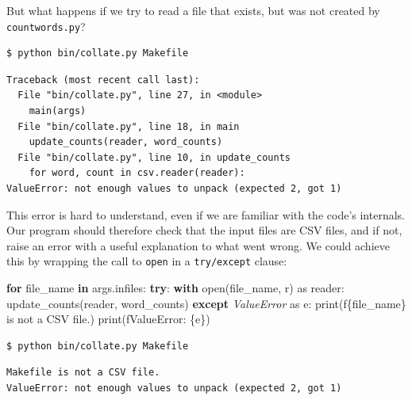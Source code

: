 \documentclass[
]{krantz}
\makeatletter
\newenvironment{Shaded}{\begin{snugshade}}{\end{snugshade}}
\newcommand{\BuiltInTok}[1]{#1}
\newcommand{\ControlFlowTok}[1]{\textcolor[rgb]{0.13,0.29,0.53}{\textbf{#1}}}
\newcommand{\ImportTok}[1]{#1}
\newcommand{\KeywordTok}[1]{\textcolor[rgb]{0.13,0.29,0.53}{\textbf{#1}}}
\newcommand{\NormalTok}[1]{#1}
\newcommand{\PreprocessorTok}[1]{\textcolor[rgb]{0.56,0.35,0.01}{\textit{#1}}}
\newcommand{\SpecialCharTok}[1]{\textcolor[rgb]{0.00,0.00,0.00}{#1}}
\newcommand{\SpecialStringTok}[1]{\textcolor[rgb]{0.31,0.60,0.02}{#1}}
\newcommand{\StringTok}[1]{\textcolor[rgb]{0.31,0.60,0.02}{#1}}
\newenvironment{kframe}{%
\medskip{}
\setlength{\fboxsep}{.8em}
 \def\at@end@of@kframe{}%
 \ifinner\ifhmode%
  \def\at@end@of@kframe{\end{minipage}}%
  \begin{minipage}{\columnwidth}%
 \fi\fi%
 \def\FrameCommand##1{\hskip\@totalleftmargin \hskip-\fboxsep
 \colorbox{shadecolor}{##1}\hskip-\fboxsep
     \hskip-\linewidth \hskip-\@totalleftmargin \hskip\columnwidth}%
 \MakeFramed {\advance\hsize-\width
   \@totalleftmargin\z@ \linewidth\hsize
   \@setminipage}}%
 {\par\unskip\endMakeFramed%
 \at@end@of@kframe}
\renewenvironment{Shaded}{\begin{kframe}}{\end{kframe}}
\makeatother
\begin{document}
But what happens if we try to read a file that exists,
but was not created by \texttt{countwords.py}?

\begin{verbatim}
$ python bin/collate.py Makefile
\end{verbatim}

\begin{verbatim}
Traceback (most recent call last):
  File "bin/collate.py", line 27, in <module>
    main(args)
  File "bin/collate.py", line 18, in main
    update_counts(reader, word_counts)
  File "bin/collate.py", line 10, in update_counts
    for word, count in csv.reader(reader):
ValueError: not enough values to unpack (expected 2, got 1)
\end{verbatim}

This error is hard to understand,
even if we are familiar with the code's internals.
Our program should therefore check that the input files are CSV files,
and if not,
raise an error with a useful explanation to what went wrong.
We could achieve this by wrapping the call to \texttt{open} in a \texttt{try/except} clause:

\begin{Shaded}
\begin{Highlighting}[]
\ControlFlowTok{for}\NormalTok{ file\_name }\KeywordTok{in}\NormalTok{ args.infiles:}
    \ControlFlowTok{try}\NormalTok{:}
        \ControlFlowTok{with} \BuiltInTok{open}\NormalTok{(file\_name, }\StringTok{\textquotesingle{}r\textquotesingle{}}\NormalTok{) }\ImportTok{as}\NormalTok{ reader:}
\NormalTok{            update\_counts(reader, word\_counts)}
    \ControlFlowTok{except} \PreprocessorTok{ValueError} \ImportTok{as}\NormalTok{ e:}
        \BuiltInTok{print}\NormalTok{(}\SpecialStringTok{f\textquotesingle{}}\SpecialCharTok{\{}\NormalTok{file\_name}\SpecialCharTok{\}}\SpecialStringTok{ is not a CSV file.\textquotesingle{}}\NormalTok{)}
        \BuiltInTok{print}\NormalTok{(}\SpecialStringTok{f\textquotesingle{}ValueError: }\SpecialCharTok{\{e\}}\SpecialStringTok{\textquotesingle{}}\NormalTok{)}
\end{Highlighting}
\end{Shaded}

\begin{verbatim}
$ python bin/collate.py Makefile
\end{verbatim}

\begin{verbatim}
Makefile is not a CSV file.
ValueError: not enough values to unpack (expected 2, got 1)
\end{verbatim}
\end{document}
